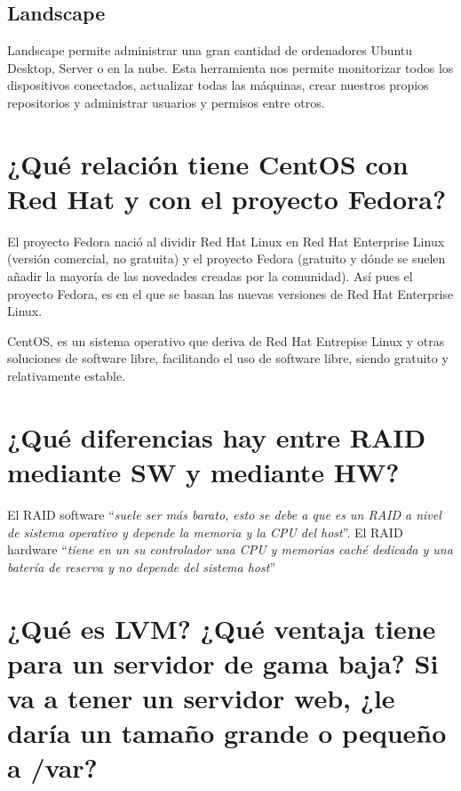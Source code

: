 \subsection{Landscape}
Landscape permite administrar una gran cantidad de ordenadores Ubuntu Desktop, Server o en la nube. Esta herramienta nos permite monitorizar todos los dispositivos conectados, actualizar todas las máquinas, crear nuestros propios repositorios y administrar usuarios y permisos entre otros. \cite{c4b}
\section{¿Qué relación tiene CentOS con Red Hat y con el proyecto Fedora?}
El proyecto Fedora nació al dividir Red Hat Linux en Red Hat Enterprise Linux (versión comercial, no gratuita) y el proyecto Fedora (gratuito y dónde se suelen añadir la mayoría de las novedades creadas por la comunidad). Así pues el proyecto Fedora, es en el que se basan las nuevas versiones de Red Hat Enterprise Linux.

CentOS, es un sistema operativo que deriva de Red Hat Entrepise Linux y otras soluciones de software libre, facilitando el uso de software libre, siendo gratuito y relativamente estable.\cite{c5}
\section{¿Qué diferencias hay entre RAID mediante SW y mediante HW?}
El RAID software ``\textit{suele ser más barato, esto se debe a que es un RAID a nivel de sistema operativo y depende la memoria y la CPU del host}''. El RAID hardware ``\textit{tiene en un su controlador una CPU y memorias caché dedicada y una batería de reserva y no depende del sistema host}''\cite{c6}
\section{¿Qué es LVM? ¿Qué ventaja tiene para un servidor de gama baja? Si va a tener un servidor web, ¿le daría un tamaño grande o pequeño a /var?}

